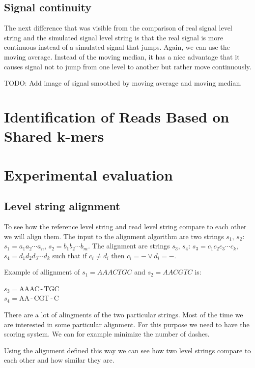 \subsection{Signal continuity}

The next difference that was visible from the comparison of real signal level string
and the simulated signal level string is that the real signal is more continuous instead
of a simulated signal that jumps. Again, we can use the moving average. Instead of
the moving median, it has a nice advantage that it causes signal not to jump from
one level to another but rather move continuously.

TODO: Add image of signal smoothed by moving average and moving median.

\section{Identification of Reads Based on Shared k-mers}



\section{Experimental evaluation}


\subsection{Level string alignment}

To see how the reference level string and read level string compare to each other
we will align them. The input to the alignment algorithm are two strings $s_1$, $s_2$:
$s_1=a_1a_2\cdots a_n$, $s_2=b_1b_2\cdots b_m$. The alignment are strings
$s_3$, $s_4$: $s_3 = c_1c_2c_3\cdots c_k$, $s_4 = d_1d_2d_3\cdots d_k$
such that if $c_i \neq d_i$ then $c_i = - \lor d_i = -$.

Example of allignment of $s_1 = AAACTGC$ and $s_2 = AACGTC$ is:

\begin{center}
$s_3 = $AAAC\,-\,TGC\\
$s_4 = $AA\,-\,CGT\,-\,C
\end{center}

There are a lot of alingments of the two particular strings. Most of the time we
are interested in some particular alignment. For this purpose we need to have the
scoring system. We can for example minimize the number of dashes.

Using the alignment defined this way we can see how two level strings compare to
each other and how similar they are.

